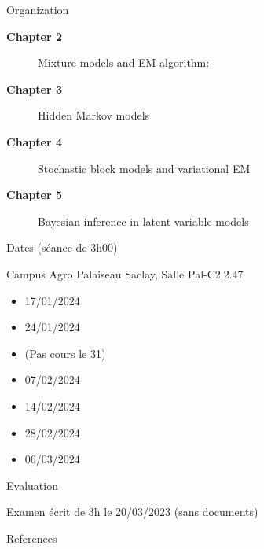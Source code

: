 \documentclass[compress,10pt]{beamer}
\begin{document}
\begin{frame}{Organization}
 \begin{description}
  \item[\textbf{\color{dgreen} Chapter 2}] Mixture models and EM algorithm: 
  \item[\textbf{\color{dgreen} Chapter 3}] Hidden Markov models
  \item[\textbf{\color{dgreen} Chapter 4}] Stochastic block models and variational EM
  \item[\textbf{\color{dgreen} Chapter 5}] Bayesian inference in latent variable models
 \end{description}
\end{frame}
\begin{frame}{
Dates (séance de 3h00)} 

Campus Agro Palaiseau Saclay,   Salle Pal-C2.2.47 


\begin{itemize}
\item 17/01/2024
\item 24/01/2024 
\item (Pas cours le 31)  
\item 07/02/2024 
\item 14/02/2024
\item 28/02/2024
\item  06/03/2024
 
\end{itemize}

 
 
 
 
\end{frame}


\begin{frame}{Evaluation}
 
 
 Examen écrit de 3h le 20/03/2023 (sans documents)
 
 
\end{frame}





\begin{frame}{References}

 
\end{frame}
  
\end{document}

